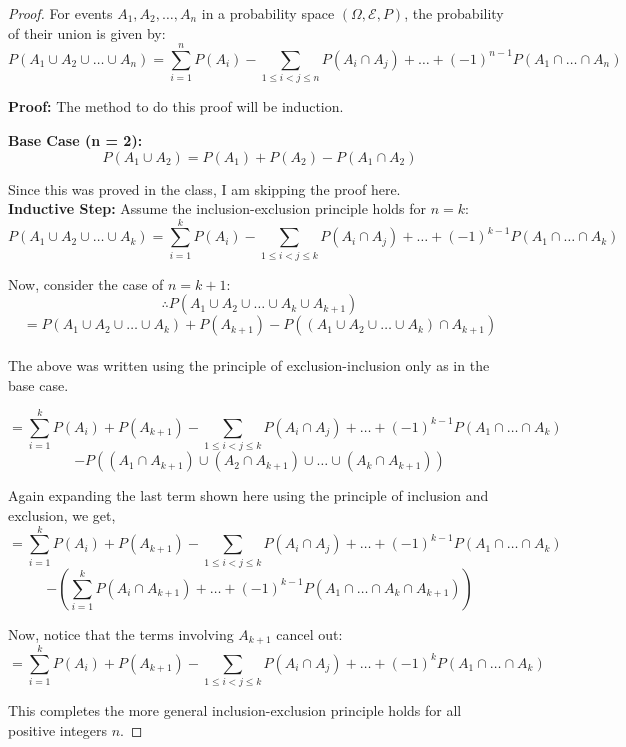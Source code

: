 \documentclass{article}
\theoremstyle{definition}
\begin{document}
\begin{proof}
    
For events \(A_1, A_2, \ldots, A_n\) in a probability space \((\Omega, \mathcal{E}, P)\), the probability of their union is given by:
\[ P(A_1 \cup A_2 \cup \ldots \cup A_n) = \sum_{i=1}^{n} P(A_i) - \sum_{1 \leq i < j \leq n} P(A_i \cap A_j) + \ldots + (-1)^{n-1}P(A_1 \cap \ldots \cap A_n) \]

\textbf{Proof:}
The method to do this proof will be induction.

\textbf{Base Case (n = 2):}
\[ P(A_1 \cup A_2) = P(A_1) + P(A_2) - P(A_1 \cap A_2) \]

Since this was proved in the class, I am skipping the proof here.\\

\textbf{Inductive Step:}
Assume the inclusion-exclusion principle holds for \(n = k\):
\[ P(A_1 \cup A_2 \cup \ldots \cup A_k) = \sum_{i=1}^{k} P(A_i) - \sum_{1 \leq i < j \leq k} P(A_i \cap A_j) + \ldots + (-1)^{k-1}P(A_1 \cap \ldots \cap A_k) \]

Now, consider the case of \(n = k + 1\):
\[\therefore P(A_1 \cup A_2 \cup \ldots \cup A_k \cup A_{k+1}) \]
\[ = P(A_1 \cup A_2 \cup \ldots \cup A_k) + P(A_{k+1}) - P((A_1 \cup A_2 \cup \ldots \cup A_k) \cap A_{k+1}) \]
\\
The above was written using the principle of exclusion-inclusion only as in the base case.

\[ = \sum_{i=1}^{k} P(A_i) + P(A_{k+1}) - \sum_{1 \leq i < j \leq k} P(A_i \cap A_j) + \ldots + (-1)^{k-1}P(A_1 \cap \ldots \cap A_k)\]\[ - P((A_1 \cap A_{k+1}) \cup (A_2 \cap A_{k+1}) \cup \dots \cup (A_k \cap A_{k+1}))\]

Again expanding the last term shown here using the principle of inclusion and exclusion, we get,\\
\[ = \sum_{i=1}^{k} P(A_i) + P(A_{k+1}) - \sum_{1 \leq i < j \leq k} P(A_i \cap A_j) + \ldots + (-1)^{k-1}P(A_1 \cap \ldots \cap A_k) \]
\[ - \left( \sum_{i=1}^{k} P(A_i \cap A_{k+1}) + \ldots + (-1)^{k-1} P(A_1 \cap \ldots \cap A_k \cap A_{k+1}) \right) \]

Now, notice that the terms involving \(A_{k+1}\) cancel out:
\[ = \sum_{i=1}^{k} P(A_i) + P(A_{k+1}) - \sum_{1 \leq i < j \leq k} P(A_i \cap A_j) + \ldots + (-1)^{k} P(A_1 \cap \ldots \cap A_k) \]

This completes the more general inclusion-exclusion principle holds for all positive integers \(n\).

\end{proof}
\end{document}
